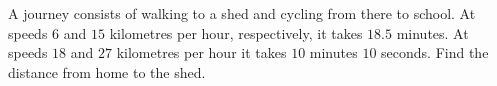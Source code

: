 A journey consists of walking to a shed and cycling from there to school. At speeds $6$ and $15$ kilometres per hour, respectively, it takes $18.5$ minutes. At speeds $18$ and $27$ kilometres per hour it takes $10$ minutes $10$ seconds. Find the distance from home to the shed.
